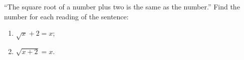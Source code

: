 ``The square root of a number plus two is the same as the number.'' Find the number for each reading of the sentence:
\begin{enumerate}
\item[(a)] $\sqrt{x}+2=x$;
\item[(b)] $\sqrt{x+2}=x$.
\end{enumerate}

